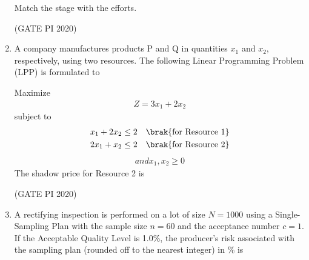 \documentclass[journal,12pt,onecolumn]{IEEEtran}
\theoremstyle{remark}
\begin{document}
\begin{enumerate}


Match the stage with the efforts.
\begin{enumerate}
\end{enumerate}

\hfill (GATE PI 2020)

\item A company manufactures products P and Q in quantities $x_1$ and $x_2$, respectively, using two resources. The following Linear Programming Problem (LPP) is formulated to


Maximize 
\begin{align*}
Z = 3x_1 + 2x_2
\end{align*}
subject to 
\begin{align*}
x_1 + 2x_2 \leq 2 \quad \brak{\text{for Resource 1}} \\
2x_1 + x_2 \leq 2 \quad \brak{\text{for Resource 2}}
\end{align*}
\begin{align*}
and x_1, x_2 \geq 0
\end{align*}
The shadow price for Resource 2 is
\begin{enumerate}
\end{enumerate}

\hfill (GATE PI 2020)

\item A rectifying inspection is performed on a lot of size $N = 1000$ using a Single-Sampling Plan with the sample size $n = 60$ and the acceptance number $c = 1$. If the Acceptable Quality Level is 1.0\%, the producer's risk associated with the sampling plan (rounded off to the nearest integer) in \% is
\begin{enumerate}
\end{enumerate}


\end{enumerate}
\end{document}
